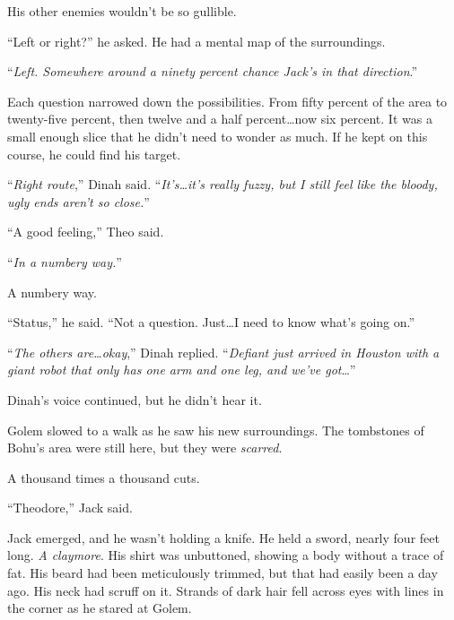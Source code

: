 His other enemies wouldn't be so gullible.



``Left or right?'' he asked.  He had a mental map of the surroundings.



``\emph{Left.  Somewhere around a ninety percent chance Jack's in that direction}.''



Each question narrowed down the possibilities.  From fifty percent of the area to twenty-five percent, then twelve and a half percent\ldots now six percent.  It was a small enough slice that he didn't need to wonder as much.  If he kept on this course, he could find his target.



``\emph{Right route},'' Dinah said.  ``\emph{It's\ldots it's really fuzzy, but I still feel like the bloody, ugly ends aren't so close.}''



``A good feeling,'' Theo said.



``\emph{In a numbery way.}''



A numbery way.



``Status,'' he said.  ``Not a question.  Just\ldots I need to know what's going on.''



``\emph{The others are\ldots okay},'' Dinah replied.  ``\emph{Defiant just arrived in Houston with a giant robot that only has one arm and one leg, and we've got}\ldots''



Dinah's voice continued, but he didn't hear it.



Golem slowed to a walk as he saw his new surroundings.  The tombstones of Bohu's area were still here, but they were \emph{scarred}.



A thousand times a thousand cuts.



``Theodore,'' Jack said.



Jack emerged, and he wasn't holding a knife.  He held a sword, nearly four feet long.  \emph{A claymore}.  His shirt was unbuttoned, showing a body without a trace of fat.  His beard had been meticulously trimmed, but that had easily been a day ago.  His neck had scruff on it.  Strands of dark hair fell across eyes with lines in the corner as he stared at Golem.



